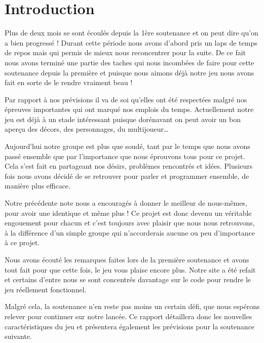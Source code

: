 \documentclass{article}
\begin{document}
\section{Introduction}
\par
Plus de deux mois se sont écoulés depuis la 1ère soutenance et on peut dire qu’on a bien progressé !
Durant cette période nous avons d’abord pris un laps de temps de repos mais qui permis de mieux nous reconcentrer pour la suite.
De ce fait nous avons terminé une partie des taches qui nous incombées de faire pour cette soutenance depuis la première et puisque nous aimons déjà notre jeu nous avons fait en sorte de le rendre vraiment beau !
\newline
\par
Par rapport à nos prévisions il va de soi qu’elles ont été respectées malgré nos épreuves importantes qui ont marqué nos emplois du temps.
Actuellement notre jeu est déjà à un stade intéressant puisque dorénavant on peut avoir un bon aperçu des décors, des personnages, du multijoueur…
\newline
\par
Aujourd’hui notre groupe est plus que soudé, tant par le temps que nous avons passé ensemble  que par  l'importance que nous éprouvons tous pour ce projet. Cela s’est fait en partageant nos désirs, problèmes rencontrés et idées. Plusieurs fois nous avons décidé de se retrouver pour parler et programmer ensemble, de manière plus efficace. 
\newline
\par
Notre précédente note nous a encouragés à donner le meilleur de nous-mêmes, pour avoir une identique et même plus ! Ce projet est donc devenu un véritable engouement pour chacun et c’est toujours avec plaisir que nous nous retrouvons, à la différence d’un simple groupe qui n’accorderais aucune ou peu d’importance à ce projet.
\newline
\par
Nous avons écouté les remarques faites lors de la première soutenance et avons tout fait pour que cette fois, le jeu vous plaise encore plus. Notre site a été refait et certains d’entre nous se sont concentrés davantage sur le code pour rendre le jeu réellement fonctionnel.
\newline
\par
Malgré cela, la soutenance n'en reste pas moins un certain défi, que nous espérons relever pour continuer sur notre lancée.
Ce rapport détaillera donc les nouvelles caractéristiques du jeu et présentera également les prévisions pour la soutenance suivante.
\end{document}
